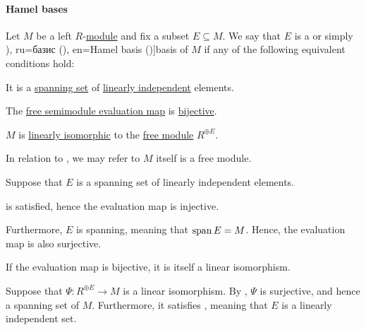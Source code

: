 \paragraph{Hamel bases}

\begin{definition}\label{def:hamel_basis}\mimprovised
  Let \( M \) be a left \( R \)-\hyperref[def:module]{module} and fix a subset \( E \subseteq M \). We say that \( E \) is a  or simply \term[bg=базис (\cite[100]{Обрешков1962ВисшаАлгебра}), ru=базис (\cite[\S 3.7]{Тыртышников2007ЛинейнаяАлгебра}), en=Hamel basis (\cite[example B-2.12]{Rotman2015AlgebraPart1})]{basis} of \( M \) if any of the following equivalent conditions hold:

  \begin{thmenum}
     It is a \hyperref[thm:span_via_linear_combinations]{spanning set} of \hyperref[def:linear_dependence]{linearly independent} elements.

     The \hyperref[thm:free_semimodule_universal_property]{free semimodule evaluation map} is \hyperref[def:function_invertibility/bijective]{bijective}.

     \( M \) is \hyperref[def:linear_function]{linearly isomorphic} to the \hyperref[def:free_semimodule]{free module} \( R^{\oplus E} \).
  \end{thmenum}
\end{definition}
\begin{comments}
  \item In relation to , we may refer to \( M \) itself is a free module.
\end{comments}
\begin{defproof}
   Suppose that \( E \) is a spanning set of linearly independent elements.

   is satisfied, hence the evaluation map is injective.

  Furthermore, \( E \) is spanning, meaning that \( \operatorname{span} E = M \). Hence, the evaluation map is also surjective.

   If the evaluation map is bijective, it is itself a linear isomorphism.

   Suppose that \( \Psi: R^{\oplus E} \to M \) is a linear isomorphism. By , \( \Psi \) is surjective, and hence a spanning set of \( M \). Furthermore, it satisfies , meaning that \( E \) is a linearly independent set.
\end{defproof}

